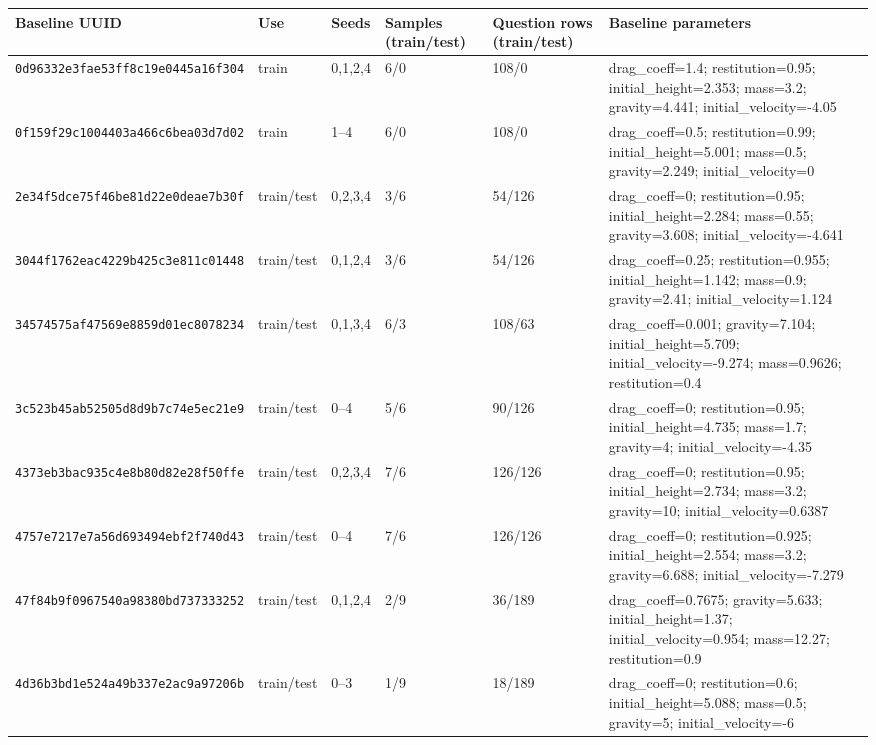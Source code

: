 \begingroup
\scriptsize
\setlength{\tabcolsep}{3pt}
\setlength{\aboverulesep}{0pt}
\setlength{\belowrulesep}{2pt}
\renewcommand{\arraystretch}{1.05}
\begin{tabular*}{\textwidth}{@{\extracolsep{\fill}}llllll@{}}
\toprule
\textbf{Baseline UUID} & \textbf{Use} & \textbf{Seeds} & \textbf{Samples (train/test)} & \textbf{Question rows (train/test)} & \textbf{Baseline parameters} \\
\midrule
\texttt{0d96332e3fae53ff8c19e0445a16f304} & train & 0,1,2,4 & 6/0 & 108/0 & drag\_coeff=1.4; restitution=0.95; initial\_height=2.353; mass=3.2; gravity=4.441; initial\_velocity=-4.05 \\
\texttt{0f159f29c1004403a466c6bea03d7d02} & train & 1--4 & 6/0 & 108/0 & drag\_coeff=0.5; restitution=0.99; initial\_height=5.001; mass=0.5; gravity=2.249; initial\_velocity=0 \\
\texttt{2e34f5dce75f46be81d22e0deae7b30f} & train/test & 0,2,3,4 & 3/6 & 54/126 & drag\_coeff=0; restitution=0.95; initial\_height=2.284; mass=0.55; gravity=3.608; initial\_velocity=-4.641 \\
\texttt{3044f1762eac4229b425c3e811c01448} & train/test & 0,1,2,4 & 3/6 & 54/126 & drag\_coeff=0.25; restitution=0.955; initial\_height=1.142; mass=0.9; gravity=2.41; initial\_velocity=1.124 \\
\texttt{34574575af47569e8859d01ec8078234} & train/test & 0,1,3,4 & 6/3 & 108/63 & drag\_coeff=0.001; gravity=7.104; initial\_height=5.709; initial\_velocity=-9.274; mass=0.9626; restitution=0.4 \\
\texttt{3c523b45ab52505d8d9b7c74e5ec21e9} & train/test & 0--4 & 5/6 & 90/126 & drag\_coeff=0; restitution=0.95; initial\_height=4.735; mass=1.7; gravity=4; initial\_velocity=-4.35 \\
\texttt{4373eb3bac935c4e8b80d82e28f50ffe} & train/test & 0,2,3,4 & 7/6 & 126/126 & drag\_coeff=0; restitution=0.95; initial\_height=2.734; mass=3.2; gravity=10; initial\_velocity=0.6387 \\
\texttt{4757e7217e7a56d693494ebf2f740d43} & train/test & 0--4 & 7/6 & 126/126 & drag\_coeff=0; restitution=0.925; initial\_height=2.554; mass=3.2; gravity=6.688; initial\_velocity=-7.279 \\
\texttt{47f84b9f0967540a98380bd737333252} & train/test & 0,1,2,4 & 2/9 & 36/189 & drag\_coeff=0.7675; gravity=5.633; initial\_height=1.37; initial\_velocity=0.954; mass=12.27; restitution=0.9 \\
\texttt{4d36b3bd1e524a49b337e2ac9a97206b} & train/test & 0--3 & 1/9 & 18/189 & drag\_coeff=0; restitution=0.6; initial\_height=5.088; mass=0.5; gravity=5; initial\_velocity=-6 \\

\end{tabular*}
